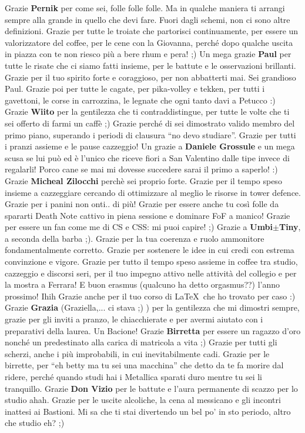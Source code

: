 \documentclass[10pt]{amsart}
\newcommand{\n}[1]{{\Large \bf #1}}
\begin{document}
Grazie \n{Pernik} per come sei, folle folle folle. Ma in qualche maniera ti arrangi sempre alla grande in quello che devi fare. Fuori dagli schemi, non ci sono altre definizioni. Grazie per tutte le troiate che partorisci continuamente, per essere un valorizzatore del coffee, per le cene con la Giovanna, perché dopo qualche uscita in piazza con te non riesco più a bere rhum e pera! ;) Un mega grazie \n{Paul} per tutte le risate che ci siamo fatti insieme, per le battute e le osservazioni brillanti. Grazie per il tuo spirito forte e coraggioso, per non abbatterti mai. Sei grandioso Paul. Grazie poi per tutte le cagate, per pika-volley e tekken, per tutti i gavettoni, le corse in carrozzina, le legnate che ogni tanto davi a Petucco :)
Grazie \n{Wiito} per la gentilezza che ti contraddistingue, per tutte le volte che ti sei offerto di farmi un caffè ;) Grazie perché di sei dimostrato valido membro del primo piano, superando i periodi di clausura ``no devo studiare''. Grazie per tutti i pranzi assieme e le pause cazzeggio!
Un grazie a \n{Daniele Grossule} e un mega scusa se lui può ed è l'unico che riceve fiori a San Valentino dalle tipe invece di regalarli! Porco cane se mai mi dovesse succedere sarai il primo a saperlo! :)
Grazie \n{Micheal Zilocchi} perchè sei proprio forte. Grazie per il tempo speso insieme a cazzeggiare cercando di ottimizzare al meglio le risorse in tower defence. Grazie per i panini non onti.. di più! Grazie per essere anche tu così folle da spararti Death Note cattivo in piena sessione e dominare FoF a manico! Grazie per essere un fan come me di CS e CSS: mi puoi capire! ;)
Grazie a \n{Umbi$\pm$Tiny}, a seconda della barba ;). Grazie per la tua coerenza e ruolo ammonitore fondamentalmente corretto. Grazie per sostenere le idee in cui credi con estrema convinzione e vigore. Grazie per tutto il tempo speso assieme in coffee tra studio, cazzeggio e discorsi seri, per il tuo impegno attivo nelle attività del collegio e per la mostra a Ferrara! E buon erasmus (qualcuno ha detto orgasmus??) l'anno prossimo! Ihih Grazie anche per il tuo corso di \LaTeX \ che ho trovato per caso :) Grazie \n{Grazia} (Graziella,... ci stava ;) ) per la gentilezza che mi dimostri sempre, grazie per gli inviti a pranzo, le chiacchierate e per avermi aiutato con i preparativi della laurea. Un Bacione! Grazie \n{Birretta} per essere un ragazzo d'oro nonché un predestinato alla carica di matricola a vita ;) Grazie per tutti gli scherzi, anche i più improbabili, in cui inevitabilmente cadi. Grazie per le birrette, per ``eh betty ma tu sei una macchina'' che detto da te fa morire dal ridere, perché quando studi hai i Metallica sparati duro mentre tu sei li tranquillo. Grazie \n{Don Vizio} per le battute e l'aura permanente di scazzo per lo studio ahah. Grazie per le uscite alcoliche, la cena al messicano e gli incontri inattesi ai Bastioni. Mi sa che ti stai divertendo un bel po' in sto periodo, altro che studio eh? ;) 
\end{document}
